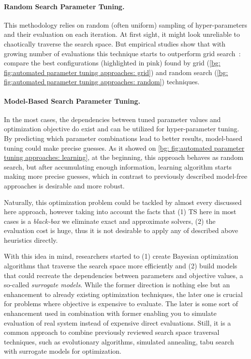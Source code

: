 \paragraph{Random Search Parameter Tuning.} This methodology relies on random (often uniform) sampling of hyper-parameters and their evaluation on each iteration. At first sight, it might look unreliable to chaotically traverse the search space. But empirical studies show that with growing number of evaluations this technique starts to outperform grid search~\cite{bergstra2012random}: compare the best configurations (highlighted in pink) found by grid (\cref{bg: fig:automated parameter tuning approaches: grid}) and random search (\cref{bg: fig:automated parameter tuning approaches: random}) techniques.

\paragraph{Model-Based Search Parameter Tuning.} In the most cases, the dependencies between tuned parameter values and optimization objective do exist and can be utilized for hyper-parameter tuning. By predicting which parameter combinations lead to better results, model-based tuning could make precise guesses. As it showed on \cref{bg: fig:automated parameter tuning approaches: learning}, at the beginning, this approach behaves as random search, but after accumulating enough information, learning algorithm starts making more precise guesses, which in contrast to previously described model-free approaches is desirable and more robust.

Naturally, this optimization problem could be tackled by almost every discussed here approach, however taking into account the facts that (1) TS here in most cases is a \textit{black-box} we eliminate exact and approximate solvers, (2) the evaluation cost is huge, thus it is not desirable to apply any of described above heuristics directly.

With this idea in mind, researchers started to (1) create  Bayesian optimization algorithms that traverse the search space more efficiently and (2) build models that could recreate the dependencies between parameters and objective values, a so-called \textit{surrogate models}. While the former direction is nothing else but an enhancement to already existing optimization techniques, the later one is crucial for problems where objective is expensive to evaluate.
The later is some sort of enhancement used in combination with former enabling you to simulate evaluation of real system instead of expensive direct evaluations. Still, it is a common approach to combine previously reviewed search space traversal techniques, such as evolutionary algorithms, simulated annealing, tabu search with surrogate models for optimization.


